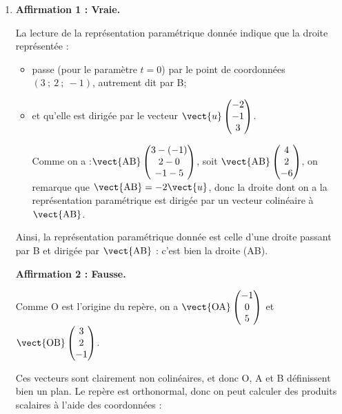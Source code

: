\medskip

\begin{enumerate}
	\item \textbf{Affirmation 1 : Vraie.}

	La lecture de la représentation paramétrique donnée indique que la droite représentée :
	\begin{itemize}
		\item passe (pour le paramètre $t=0$) par le point de coordonnées $(3 ~;~ 2 ~;~ -1)$, autrement dit par B;
		\item et qu'elle est dirigée par le vecteur $\vect{u} \begin{pmatrix}-2 \\-1 \\ 3\end{pmatrix}$.

		Comme on a :\quad $\vect{\mathrm{AB}} \begin{pmatrix} 3 - (-1) \\ 2 - 0 \\ -1 - 5\end{pmatrix}$, soit $\vect{\mathrm{AB}} \begin{pmatrix} 4 \\ 2 \\ -6\end{pmatrix}$, on remarque que $\vect{\mathrm{AB}} = -2\vect{u}$, donc la droite dont on a la représentation paramétrique est dirigée par un vecteur colinéaire à $\vect{\mathrm{AB}}$.
	\end{itemize}

	Ainsi, la représentation paramétrique donnée est celle d'une droite passant par B et dirigée par $\vect{\mathrm{AB}}$ : c'est bien la droite (AB).

	\medskip

	\textbf{Affirmation 2 : Fausse.}

	Comme O est l'origine du repère, on a $\vect{\mathrm{OA}}\begin{pmatrix} -1 \\ 0 \\ 5	\end{pmatrix}$ et $\vect{\mathrm{OB}}\begin{pmatrix} 3 \\ 2 \\ -1	\end{pmatrix}$.

	Ces vecteurs sont clairement non colinéaires, et donc O, A et B définissent bien un plan. Le repère est orthonormal, donc on peut calculer des produits scalaires à l'aide des coordonnées :


\end{enumerate}
